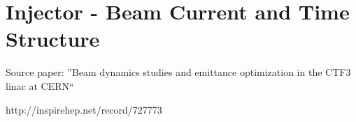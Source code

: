 \section{Injector - Beam Current and Time Structure}



Source paper: ''Beam dynamics studies and emittance optimization in the CTF3 linac at CERN``

http://inspirehep.net/record/727773
